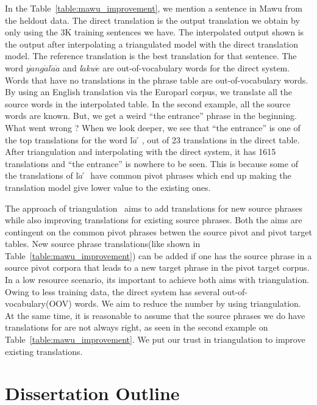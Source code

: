 In the Table~\ref{table:mawu_improvement}, we mention a sentence in Mawu from the heldout data. The direct translation is the output translation we obtain by only using the 3K training sentences we have. The interpolated output shown is the output after interpolating a triangulated model with the direct translation model. The reference translation is the best translation for that sentence. The word \emph{$y\grave{a}ng\acute{a}l\acute{a}\grave{a}$} and \emph{l$\acute{a}$kw$\acute{e}$} are out-of-vocabulary words for the direct system. Words that have no translations in the phrase table are out-of-vocabulary words. By using an English translation via the Europarl corpus, we translate all the source words in the interpolated table. In the second example, all the source words are known. But, we get a weird ``the entrance'' phrase in the beginning. What went wrong ? When we look deeper, we see that ``the entrance'' is one of the top translations for the word l$\grave{a}́$, out of 23 translations in the direct table. After triangulation and interpolating with the direct system, it has 1615 translations and ``the entrance'' is nowhere to be seen. This is because some of the translations of l$\grave{a}́$ have common pivot phrases which end up making the translation model give lower value to the existing ones. 


The approach of triangulation~\cite{Cohn:07,Utiyama:07,Nakov:12} aims to add translations for new source phrases while also improving translations for existing source phrases. Both the aims are contingent on the common pivot phrases betwen the source pivot and pivot target tables. New source phrase translations(like shown in Table~\ref{table:mawu_improvement}) can be added if one has the source phrase in a source pivot corpora that leads to a new target phrase in the pivot target corpus. In a low resource scenario, its important to achieve both aims with triangulation. Owing to less training data, the direct system has several out-of-vocabulary(OOV) words. We aim to reduce the number by using triangulation. At the same time, it is reasonable to assume that the source phrases we do have translations for are not always right, as seen in the second example on Table~\ref{table:mawu_improvement}. We put our trust in triangulation to improve existing translations. 

\section{Dissertation Outline}
\label{sec:outline}

